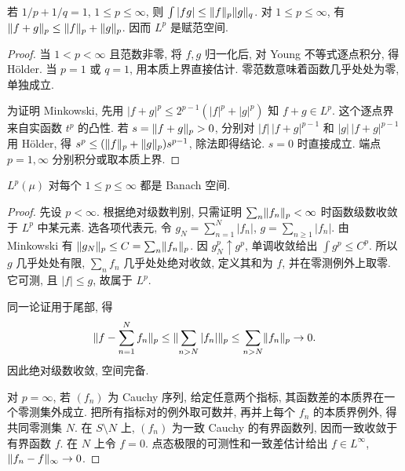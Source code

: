 \begin{theorem}\label{thm:holder-lp}
若 $1/p+1/q=1$, $1\le p\le\infty$, 则 $\int|fg|\le\lVert f\rVert_p\lVert g\rVert_q$. 对 $1\le p\le\infty$, 有 $\lVert f+g\rVert_p\le\lVert f\rVert_p+\lVert g\rVert_p$. 因而 $L^p$ 是赋范空间.
\end{theorem}
\begin{proof}
当 $1<p<\infty$ 且范数非零, 将 $f,g$ 归一化后, 对 Young 不等式逐点积分, 得 Hölder. 当 $p=1$ 或 $q=1$, 用本质上界直接估计. 零范数意味着函数几乎处处为零, 单独成立.

为证明 Minkowski, 先用 $|f+g|^p\le2^{p-1}(|f|^p+|g|^p)$ 知 $f+g\in L^p$. 这个逐点界来自实函数 $t^p$ 的凸性. 若 $s=\lVert f+g\rVert_p>0$, 分别对 $|f|\,|f+g|^{p-1}$ 和 $|g|\,|f+g|^{p-1}$ 用 Hölder, 得 $s^p\le(\lVert f\rVert_p+\lVert g\rVert_p)s^{p-1}$, 除法即得结论. $s=0$ 时直接成立. 端点 $p=1,\infty$ 分别积分或取本质上界.
\end{proof}

\begin{theorem}\label{thm:lpbanach}
$L^p(\mu)$ 对每个 $1\le p\le\infty$ 都是 Banach 空间.
\end{theorem}
\begin{proof}
先设 $p<\infty$. 根据绝对级数判别, 只需证明 $\sum_n\lVert f_n\rVert_p<\infty$ 时函数级数收敛于 $L^p$ 中某元素. 选各项代表元, 令 $g_N=\sum_{n=1}^N|f_n|$, $g=\sum_{n\ge1}|f_n|$. 由 Minkowski 有 $\lVert g_N\rVert_p\le C=\sum_n\lVert f_n\rVert_p$. 因 $g_N^p\uparrow g^p$, 单调收敛给出 $\int g^p\le C^p$. 所以 $g$ 几乎处处有限, $\sum_nf_n$ 几乎处处绝对收敛, 定义其和为 $f$, 并在零测例外上取零. 它可测, 且 $|f|\le g$, 故属于 $L^p$.

同一论证用于尾部, 得
\[
\lVert f-\sum_{n=1}^N f_n\rVert_p
\le\lVert \sum_{n>N}|f_n|\rVert_p
\le\sum_{n>N}\lVert f_n\rVert_p\to0.
\]
因此绝对级数收敛, 空间完备.

对 $p=\infty$, 若 $(f_n)$ 为 Cauchy 序列, 给定任意两个指标, 其函数差的本质界在一个零测集外成立. 把所有指标对的例外取可数并, 再并上每个 $f_n$ 的本质界例外, 得共同零测集 $N$. 在 $S\setminus N$ 上, $(f_n)$ 为一致 Cauchy 的有界函数列, 因而一致收敛于有界函数 $f$. 在 $N$ 上令 $f=0$. 点态极限的可测性和一致差估计给出 $f\in L^\infty$, $\lVert f_n-f\rVert_\infty\to0$.
\end{proof}

